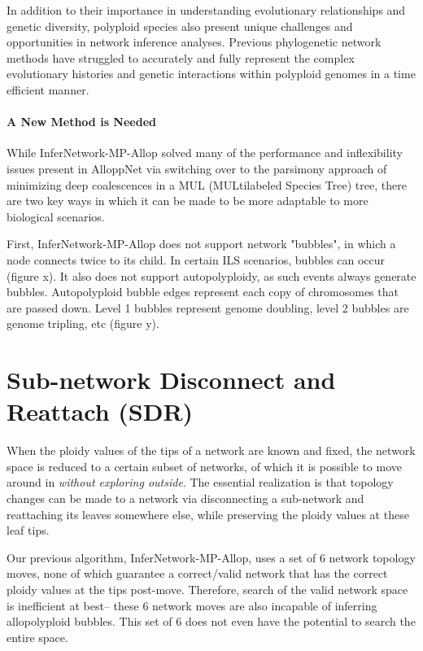\documentclass{article}
\begin{document}
In addition to their importance in understanding evolutionary relationships and genetic diversity, polyploid species also present unique challenges and opportunities in network inference analyses. Previous phylogenetic network methods have struggled  to accurately and fully represent the complex evolutionary histories and genetic interactions within polyploid genomes in a time efficient manner.


\paragraph{\color{bluem}A New Method is Needed}

While InferNetwork-MP-Allop solved many of the performance and inflexibility issues present in AlloppNet via switching over to the parsimony approach of minimizing deep coalescences in a MUL (MULtilabeled Species Tree) tree, there are two key ways in which it can be made to be more adaptable to more biological scenarios.

First, InferNetwork-MP-Allop does not support network "bubbles", in which a node connects twice to its child. In certain ILS scenarios, bubbles can occur (figure x). It also does not support autopolyploidy, as such events always generate bubbles. Autopolyploid bubble edges represent each copy of chromosomes that are passed down. Level 1 bubbles represent genome doubling, level 2 bubbles are genome tripling, etc (figure y).

\section{Sub-network Disconnect and Reattach (SDR)}

When the ploidy values of the tips of a network are known and fixed, the network space is reduced to a certain subset of networks, of which it is possible to move around in \textit{without exploring outside}. The essential realization is that topology changes can be made to a network via disconnecting a sub-network and reattaching its leaves somewhere else, while preserving the ploidy values at these leaf tips.

Our previous algorithm, InferNetwork-MP-Allop, uses a set of 6 network topology moves, none of which guarantee a correct/valid network that has the correct ploidy values at the tips post-move. Therefore, search of the valid network space is inefficient at best-- these 6 network moves are also incapable of inferring allopolyploid bubbles. This set of 6 does not even have the potential to search the entire space.
\end{document}
